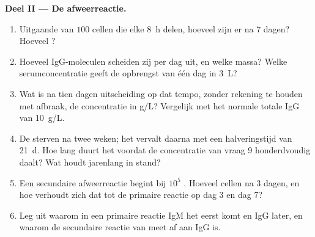 \begin{problem}
\medskip
\noindent\textbf{Deel II --- De afweerreactie.}
\begin{enumerate}[resume]
  \item Uitgaande van $100$ cellen die elke \qty{8}{h} delen, hoeveel
        zijn er na $7$ dagen? Hoeveel ?
  \item Hoeveel IgG-moleculen scheiden zij per dag uit, en welke massa?
        Welke serumconcentratie geeft de opbrengst van één dag in
        \qty{3}{L}?
  \item Wat is na tien dagen uitscheiding op dat tempo, zonder rekening
        te houden met afbraak, de concentratie in g/L? Vergelijk met
        het normale totale IgG van \qty{10}{g/L}.
  \item De  sterven na twee weken; het  vervalt
        daarna met een halveringstijd van \qty{21}{d}. Hoe lang duurt
        het voordat de concentratie van vraag 9 honderdvoudig daalt?
        Wat houdt  jarenlang in stand?
  \item Een secundaire afweerreactie begint bij $10^{5}$
        . Hoeveel cellen na $3$ dagen, en hoe verhoudt
        zich dat tot de primaire reactie op dag 3 en dag 7?
  \item Leg uit waarom in een primaire reactie IgM het eerst komt en
        IgG later, en waarom de secundaire reactie van meet af aan IgG
        is.
\end{enumerate}


\end{problem}
